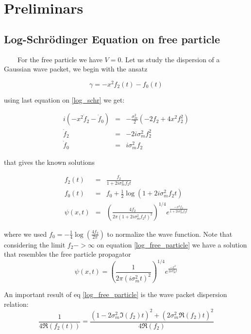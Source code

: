\documentclass[a4paper,12pt]{article}
\begin{document}
\section{Preliminars}

\subsection{Log-Schr\"odinger Equation on free particle}

~~~~For the free particle we have $V=0$. Let us study the dispersion of a Gaussian wave packet, we begin with the ansatz

\begin{equation}
\gamma = -x^2 f_2(t) - f_0(t)
\end{equation}

using last equation on \ref{log_schr} we get:

\begin{eqnarray}
i \left( -x^2 \dot f_2 - \dot f_0 \right) &=& - \frac{\sigma_m^2}{2} \left( -2 f_2 + 4 x^2 f_2^2 \right)  \nonumber \\
\dot f_2 & = & - 2 i \sigma_m^2 f_2^2 \\
\dot f_0 & = &   i \sigma_m^2 f_2
\end{eqnarray}

that gives the known solutions

\begin{eqnarray}\label{log_free_particle}
f_2(t) & = & \frac{f_2}{1 + 2i \sigma_m^2 f_2 t}  \\
f_0(t) & = & f_0 + \frac{1}{2} \log \left( 1 + 2i \sigma_m^2 f_2 t \right) \\
\psi(x,t) & = & \left( \frac{4 f_2}{2\pi \left( 1 + 2i \sigma_m^2 f_2 t  \right)^{2} } \right)^{1/4} e^{ \frac{-x^2 f_2}{ 
1 + 2i \sigma_m^2 f_2 t} } 
\end{eqnarray}

where we used $ f_0  = - \frac{1}{4} \log \left( \frac{4 f_2}{2 \pi} \right)$ to normalize the wave function. Note that considering the limit 
$f_2->\infty$  on equation \ref{log_free_particle} we have a solution that resembles the free particle propagator
\begin{equation}
\psi(x,t) =   \left( \frac{1}{2\pi \left( i \sigma_m^2 t  \right)^{2} } \right)^{1/4} e^{ \frac{-x^2}{2i \sigma_m^2 t} } 
\end{equation}

An important result of eq \ref{log_free_particle} is the wave packet dispersion relation:
\begin{equation}\label{dispersion_free_particle}
\frac{1}{4\Re(f_2(t))}  = \frac{ (1-2\sigma_m^2\Im(f_2)t)^2 + (2\sigma_m^2\Re(f_2)t)^2}{  4 \Re(f_2)  }
\end{equation}
\end{document}
